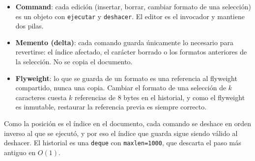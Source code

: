 \begin{itemize}
  \item \textbf{Command}: cada edición (insertar, borrar, cambiar formato de una selección) es un objeto con \texttt{ejecutar} y \texttt{deshacer}. El editor es el invocador y mantiene dos pilas.
  \item \textbf{Memento (delta)}: cada comando guarda únicamente lo necesario para revertirse: el índice afectado, el carácter borrado o los formatos anteriores de la selección. No se copia el documento.
  \item \textbf{Flyweight}: lo que se guarda de un formato es una referencia al flyweight compartido, nunca una copia. Cambiar el formato de una selección de \(k\) caracteres cuesta \(k\) referencias de 8 bytes en el historial, y como el flyweight es inmutable, restaurar la referencia previa es siempre correcto.
\end{itemize}

Como la posición es el índice en el documento, cada comando se deshace en orden inverso al que se ejecutó, y por eso el índice que guarda sigue siendo válido al deshacer. El historial es una \texttt{deque} con \texttt{maxlen=1000}, que descarta el paso más antiguo en \(O(1)\).

